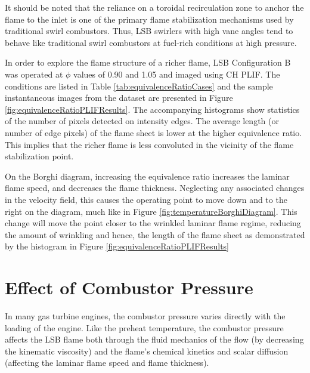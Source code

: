

It should be noted that the reliance on a toroidal recirculation zone to anchor the flame to the inlet is one of the primary flame stabilization mechanisms used by traditional swirl combustors.
Thus, LSB swirlers with high vane angles tend to behave like traditional swirl combustors at fuel-rich conditions at high pressure.

In order to explore the flame structure of a richer flame, LSB Configuration B was operated at \(\phi\) values of 0.90 and 1.05 and imaged using CH PLIF.
The conditions are listed in Table \ref{tab:equivalenceRatioCases} and the sample instantaneous images from the dataset are presented in Figure \ref{fig:equivalenceRatioPLIFResults}.
The accompanying histograms show statistics of the number of pixels detected on intensity edges.
The average length (or number of edge pixels) of the flame sheet is lower at the higher equivalence ratio.
This implies that the richer flame is less convoluted in the vicinity of the flame stabilization point.



On the Borghi diagram, increasing the equivalence ratio increases the laminar flame speed, and decreases the flame thickness.
Neglecting any associated changes in the velocity field, this causes the operating point to move down and to the right on the diagram, much like in Figure \ref{fig:temperatureBorghiDiagram}.
This change will move the point closer to the wrinkled laminar flame regime, reducing the amount of wrinkling and hence, the length of the flame sheet as demonstrated by the histogram in Figure \ref{fig:equivalenceRatioPLIFResults}

\section{Effect of Combustor Pressure}
\label{sec:lsb-effect-of-combustor-pressure}

In many gas turbine engines, the combustor pressure varies directly with the loading of the engine.
Like the preheat temperature, the combustor pressure affects the LSB flame both through the fluid mechanics of the flow (by decreasing the kinematic viscosity) and the flame's chemical kinetics and scalar diffusion (affecting the laminar flame speed and flame thickness).

